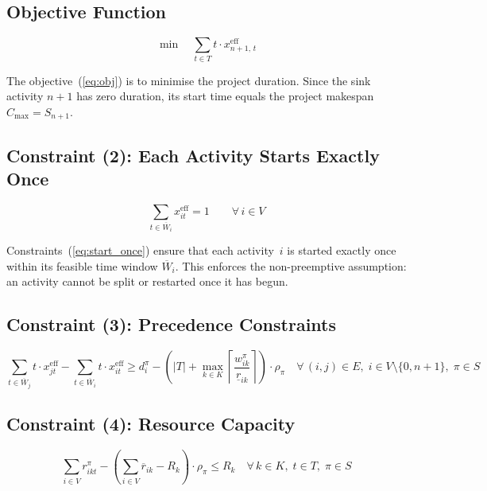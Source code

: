 \subsection*{Objective Function}

\begin{equation}
    \min \quad \sum_{t \in T} t \cdot x^{\mathrm{eff}}_{n+1,\, t}
    \tag{1}
    \label{eq:obj}
\end{equation}

The objective~(\ref{eq:obj}) is to minimise the project duration.
Since the sink activity $n+1$ has zero duration, its start time
equals the project makespan $C_{\max} = S_{n+1}$.

\subsection*{Constraint (2): Each Activity Starts Exactly Once}

\begin{equation}
    \sum_{t \in \overline{W}_i} x^{\mathrm{eff}}_{it} = 1
    \qquad \forall\, i \in V
    \tag{2}
    \label{eq:start_once}
\end{equation}

Constraints~(\ref{eq:start_once}) ensure that each activity~$i$
is started exactly once within its feasible time window
$\overline{W}_i$. This enforces the non-preemptive assumption: an
activity cannot be split or restarted once it has begun.

\subsection*{Constraint (3): Precedence Constraints}

\begin{equation}
    \sum_{t \in \overline{W}_j} t \cdot x^{\mathrm{eff}}_{jt}
    - \sum_{t \in \overline{W}_i} t \cdot x^{\mathrm{eff}}_{it}
    \geq d_i^{\pi}
    - \left(|T| + \max_{k \in K}
      \left\lceil \frac{w_{ik}^{\pi}}{\underline{r}_{ik}}
      \right\rceil\right) \cdot \rho_{\pi}
    \quad \forall\, (i,j) \in E,\;
    i \in V \setminus \{0, n{+}1\},\;
    \pi \in S
    \tag{3}
    \label{eq:precedence}
\end{equation}

\subsection*{Constraint (4): Resource Capacity}

\begin{equation}
    \sum_{i \in V} r_{ikt}^{\pi}
    - \left(\sum_{i \in V} \overline{r}_{ik} - R_k\right)
      \cdot \rho_{\pi}
    \leq R_k
    \quad \forall\, k \in K,\;
    t \in T,\;
    \pi \in S
    \tag{4}
    \label{eq:resource_cap}
\end{equation}

